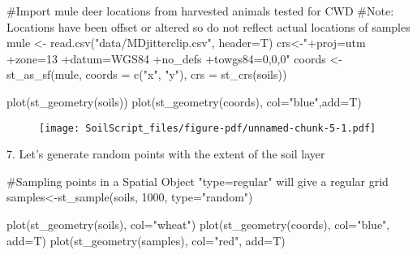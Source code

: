\documentclass[
  letterpaper,
]{book}
\newenvironment{Shaded}{\begin{snugshade}}{\end{snugshade}}
\newcommand{\AttributeTok}[1]{\textcolor[rgb]{0.40,0.45,0.13}{#1}}
\newcommand{\CommentTok}[1]{\textcolor[rgb]{0.37,0.37,0.37}{#1}}
\newcommand{\DecValTok}[1]{\textcolor[rgb]{0.68,0.00,0.00}{#1}}
\newcommand{\FunctionTok}[1]{\textcolor[rgb]{0.28,0.35,0.67}{#1}}
\newcommand{\NormalTok}[1]{\textcolor[rgb]{0.00,0.23,0.31}{#1}}
\newcommand{\OtherTok}[1]{\textcolor[rgb]{0.00,0.23,0.31}{#1}}
\newcommand{\StringTok}[1]{\textcolor[rgb]{0.13,0.47,0.30}{#1}}
\begin{document}
\begin{Shaded}
\begin{Highlighting}[]
\CommentTok{\#Import mule deer locations from harvested animals tested for CWD}
\CommentTok{\#Note: Locations have been offset or altered so do not reflect actual locations of samples}
\NormalTok{mule }\OtherTok{\textless{}{-}} \FunctionTok{read.csv}\NormalTok{(}\StringTok{"data/MDjitterclip.csv"}\NormalTok{, }\AttributeTok{header=}\NormalTok{T)}
\NormalTok{crs}\OtherTok{\textless{}{-}}\StringTok{"+proj=utm +zone=13 +datum=WGS84 +no\_defs +towgs84=0,0,0"}
\NormalTok{coords }\OtherTok{\textless{}{-}} \FunctionTok{st\_as\_sf}\NormalTok{(mule, }\AttributeTok{coords =} \FunctionTok{c}\NormalTok{(}\StringTok{"x"}\NormalTok{, }\StringTok{"y"}\NormalTok{), }\AttributeTok{crs =} \FunctionTok{st\_crs}\NormalTok{(soils))}

\FunctionTok{plot}\NormalTok{(}\FunctionTok{st\_geometry}\NormalTok{(soils))}
\FunctionTok{plot}\NormalTok{(}\FunctionTok{st\_geometry}\NormalTok{(coords), }\AttributeTok{col=}\StringTok{"blue"}\NormalTok{,}\AttributeTok{add=}\NormalTok{T)}
\end{Highlighting}
\end{Shaded}

\begin{figure}[H]

{\centering \texttt{[image: SoilScript\_files/figure-pdf/unnamed-chunk-5-1.pdf]}

}

\end{figure}

7. Let's generate random points with the extent of the soil layer

\begin{Shaded}
\begin{Highlighting}[]
\CommentTok{\#Sampling points in a Spatial Object "type=regular" will give a regular grid}
\NormalTok{samples}\OtherTok{\textless{}{-}}\FunctionTok{st\_sample}\NormalTok{(soils, }\DecValTok{1000}\NormalTok{, }\AttributeTok{type=}\StringTok{"random"}\NormalTok{)}

\FunctionTok{plot}\NormalTok{(}\FunctionTok{st\_geometry}\NormalTok{(soils), }\AttributeTok{col=}\StringTok{"wheat"}\NormalTok{)}
\FunctionTok{plot}\NormalTok{(}\FunctionTok{st\_geometry}\NormalTok{(coords), }\AttributeTok{col=}\StringTok{"blue"}\NormalTok{, }\AttributeTok{add=}\NormalTok{T)}
\FunctionTok{plot}\NormalTok{(}\FunctionTok{st\_geometry}\NormalTok{(samples), }\AttributeTok{col=}\StringTok{"red"}\NormalTok{, }\AttributeTok{add=}\NormalTok{T)}
\end{Highlighting}
\end{Shaded}
\end{document}
